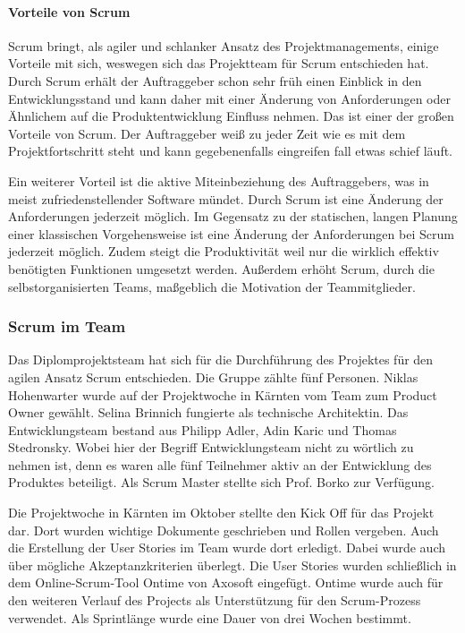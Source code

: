 \paragraph{Vorteile von Scrum}
Scrum bringt, als agiler und schlanker Ansatz des Projektmanagements, einige Vorteile mit sich, weswegen sich das Projektteam für Scrum entschieden hat. Durch Scrum erhält der Auftraggeber schon sehr früh einen Einblick in den Entwicklungsstand und kann daher mit einer Änderung von Anforderungen oder Ähnlichem auf die Produktentwicklung Einfluss nehmen. Das ist einer der großen Vorteile von Scrum. Der Auftraggeber weiß zu jeder Zeit wie es mit dem Projektfortschritt steht und kann gegebenenfalls eingreifen fall etwas schief läuft.

Ein weiterer Vorteil ist die aktive Miteinbeziehung des Auftraggebers, was in meist zufriedenstellender Software mündet. Durch Scrum ist eine Änderung der Anforderungen jederzeit möglich. Im Gegensatz zu der statischen, langen Planung einer klassischen Vorgehensweise ist eine Änderung der Anforderungen bei Scrum jederzeit möglich. Zudem steigt die Produktivität weil nur die wirklich effektiv benötigten Funktionen umgesetzt werden. Außerdem erhöht Scrum, durch die selbstorganisierten Teams, maßgeblich die Motivation der Teammitglieder.

\newpage

\subsubsection{Scrum im Team}
Das Diplomprojektsteam hat sich für die Durchführung des Projektes für den agilen Ansatz Scrum entschieden. Die Gruppe zählte fünf Personen. Niklas Hohenwarter wurde auf der Projektwoche in Kärnten vom Team zum Product Owner gewählt. Selina Brinnich fungierte als technische Architektin. Das Entwicklungsteam bestand aus Philipp Adler, Adin Karic und Thomas Stedronsky. Wobei hier der Begriff Entwicklungsteam nicht zu wörtlich zu nehmen ist, denn es waren alle fünf Teilnehmer aktiv an der Entwicklung des Produktes beteiligt. Als Scrum Master stellte sich Prof. Borko zur Verfügung.

Die Projektwoche in Kärnten im Oktober stellte den Kick Off für das Projekt dar. Dort wurden wichtige Dokumente geschrieben und Rollen vergeben. Auch die Erstellung der User Stories im Team wurde dort erledigt. Dabei wurde auch über mögliche Akzeptanzkriterien überlegt. Die User Stories wurden schließlich in dem Online-Scrum-Tool Ontime von Axosoft eingefügt. Ontime wurde auch für den weiteren Verlauf des Projects als Unterstützung für den Scrum-Prozess verwendet. Als Sprintlänge wurde eine Dauer von drei Wochen bestimmt.

